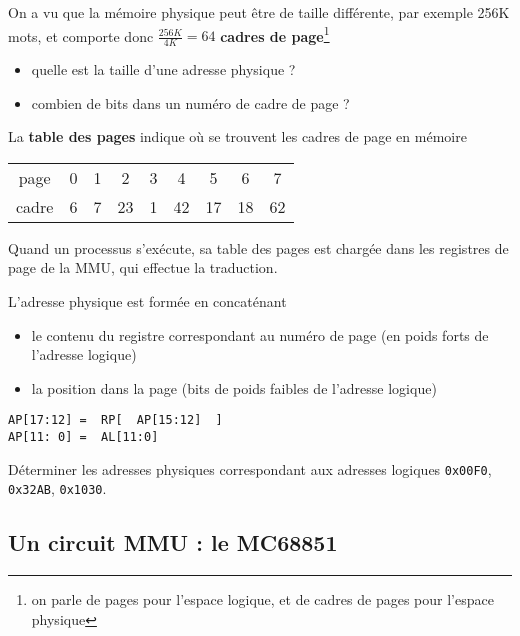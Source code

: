 \begin{multicols}{2}

On a vu que la mémoire physique peut être de taille différente, par
exemple 256K mots, et comporte donc $\frac{256K}{4K} = 64$
\textbf{cadres de page}\footnote{on parle de pages pour l'espace
logique, et de cadres de pages pour l'espace physique}

\begin{exercice}
\begin{itemize}
\item quelle est la taille d'une adresse physique ?
\item combien de bits dans un numéro de cadre de page ?
\end{itemize}
\end{exercice}

La \textbf{table des pages} indique où se trouvent
les cadres de page en mémoire

\begin{tabular}{|c||cccccccc|}
\hline
page & 0 & 1 & 2& 3 & 4 & 5 &6 & 7 \\
cadre & 6 & 7 & 23 & 1 & 42 & 17 & 18 & 62 \\
\hline
\end{tabular}


Quand un processus s'exécute, sa table des pages est chargée dans les registres
de page de la MMU, qui effectue la traduction.

L'adresse physique est formée en concaténant 
\begin{itemize}
\item le contenu du registre correspondant
au numéro de page (en poids forts de l'adresse logique) 
\item la position dans la page (bits de poids faibles de l'adresse logique)
\end{itemize}

\begin{lstlisting}
AP[17:12] =  RP[  AP[15:12]  ]
AP[11: 0] =  AL[11:0]
\end{lstlisting}


\begin{exercice}
Déterminer les adresses physiques correspondant aux adresses logiques
\texttt{0x00F0}, \texttt{0x32AB}, \texttt{0x1030}. 
\end{exercice}


\subsection{Un circuit MMU : le MC68851}
 

\end{multicols}

